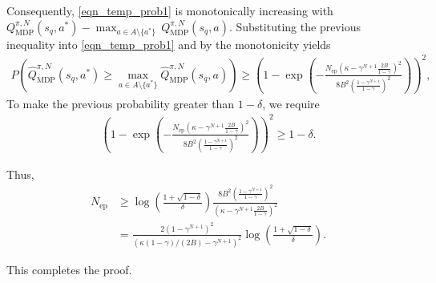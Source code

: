 \begin{myproof}
Consequently, \eqref{eqn_temp_prob1} is monotonically increasing with $Q_\text{MDP}^{\pi, N}(s_q, a^*) - \max_{a \in A \setminus \{a^*\}} \, Q_\text{MDP}^{\pi, N}(s_q, a)$.
Substituting the previous inequality into \eqref{eqn_temp_prob1} and by the monotonicity yields
\begin{align}
    P \left( \hat{Q}_\text{MDP}^{\pi, N}(s_q, a^*) \geq \max_{a \in A \setminus \{a^*\}} \hat{Q}_\text{MDP}^{\pi, N}(s_q, a) \right) 
    \geq \left( 1 - \exp \left( - \frac{N_\text{ep}  \left(\kappa - \gamma^{N+1} \frac{2B}{1-\gamma} \right)^2}{8B^2 \left( \frac{1-\gamma^{N+1}}{1-\gamma}\right)^2} \right) \right)^2,
\end{align}
%
%
%
%
To make the previous probability greater than $1-\delta$, we require
\begin{align}
    \left( 1 - \exp \left( - \frac{N_\text{ep}  \left(\kappa - \gamma^{N+1} \frac{2B}{1-\gamma} \right)^2 }{8B^2 \left( \frac{1-\gamma^{N+1}}{1-\gamma}\right)^2} \right) \right)^2 \geq 1-\delta.
\end{align}


Thus,
\begin{align}
    N_\text{ep} &\geq \log \left( \frac{1+\sqrt{1-\delta}}{\delta} \right) \frac{8B^2 \left( \frac{1-\gamma^{N+1}}{1-\gamma}\right)^2}{\left(\kappa - \gamma^{N+1} \frac{2B}{1-\gamma} \right)^2} \\
    &= \frac{ 2 \left( 1-\gamma^{N+1}\right)^2}{ \left( \kappa \left( 1-\gamma \right) / (2B) - \gamma^{N+1}\right)^2} \log \left( \frac{1+\sqrt{1-\delta}}{\delta} \right).
\end{align}





This completes the proof.

\end{myproof}





